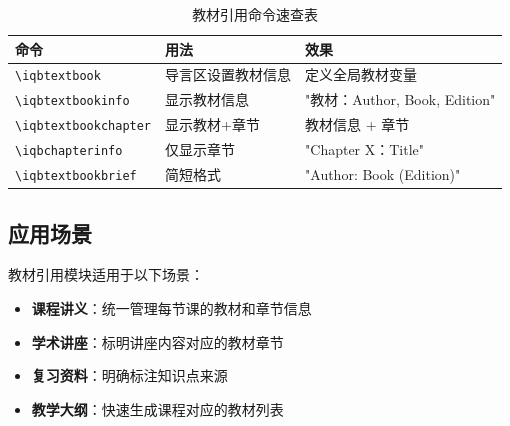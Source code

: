 \begin{table}[!h]
\centering
\caption{教材引用命令速查表}
\label{tab:textbook-commands}
\begin{tabular}{p{3cm}p{4cm}p{5cm}}
\toprule
\textbf{命令} & \textbf{用法} & \textbf{效果} \\
\midrule
\lstinline|\iqbtextbook| & 导言区设置教材信息 & 定义全局教材变量 \\
\lstinline|\iqbtextbookinfo| & 显示教材信息 & "教材：Author, Book, Edition" \\
\lstinline|\iqbtextbookchapter| & 显示教材+章节 & 教材信息 + 章节 \\
\lstinline|\iqbchapterinfo| & 仅显示章节 & "Chapter X：Title" \\
\lstinline|\iqbtextbookbrief| & 简短格式 & "Author: Book (Edition)" \\
\bottomrule
\end{tabular}
\end{table}

\subsection{应用场景}

教材引用模块适用于以下场景：

\begin{itemize}
  \item \textbf{课程讲义}：统一管理每节课的教材和章节信息
  \item \textbf{学术讲座}：标明讲座内容对应的教材章节
  \item \textbf{复习资料}：明确标注知识点来源
  \item \textbf{教学大纲}：快速生成课程对应的教材列表
\end{itemize}
